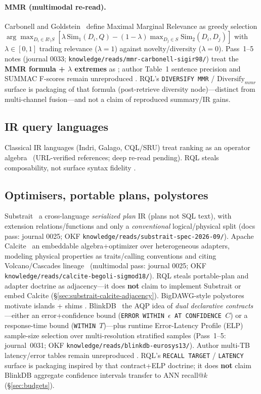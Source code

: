 \paragraph{MMR (multimodal re-read).}
Carbonell and Goldstein~\citep{carbonell1998mmr} define Maximal Marginal Relevance as greedy selection
$\arg\max_{D_i\in R\setminus S}[\lambda\,\mathrm{Sim}_1(D_i,Q)-(1-\lambda)\max_{D_j\in S}\mathrm{Sim}_2(D_i,D_j)]$
with $\lambda\in[0,1]$ trading relevance ($\lambda{=}1$) against novelty/diversity ($\lambda{=}0$).
Pass~1--5 notes (journal 0033; \texttt{knowledge/reads/mmr-carbonell-sigir98/}) treat the \textbf{MMR formula + $\lambda$ extremes} as \established{}; author Table~1 sentence precision and SUMMAC F-scores remain unreproduced \provisional{}.
RQL's \texttt{DIVERSIFY MMR} / $\mathrm{Diversify}_{mmr}$ surface is \hypothesis{} packaging of that formula (post-retrieve diversity node)---distinct from multi-channel fusion---and not a claim of reproduced summary/IR gains.

\subsection{IR query languages}
Classical IR languages (Indri, Galago, CQL/SRU) treat ranking as an operator algebra~\citep{metzler2004indri} \provisional{} (URL-verified references; deep re-read pending).
RQL steals composability, not surface syntax fidelity \hypothesis{}.

\subsection{Optimisers, portable plans, polystores}
\label{sec:rw-substrait-calcite}
Substrait~\citep{substrait} \established{} a cross-language \emph{serialized plan} IR (plans not SQL text), with extension relations/functions and only a \emph{conventional} logical/physical split (docs pass: journal 0025; OKF \texttt{knowledge/reads/substrait-spec-2026-09/}).
Apache Calcite~\citep{begoli2018calcite} \established{} an embeddable algebra+optimizer over heterogeneous adapters, modeling physical properties as traits/calling conventions and citing Volcano/Cascades lineage~\citep{graefe1995cascades} (multimodal pass: journal 0025; OKF \texttt{knowledge/reads/calcite-begoli-sigmod18/}).
RQL steals portable-plan and adapter doctrine as \hypothesis{} adjacency---it does \textbf{not} claim to implement Substrait or embed Calcite (\S\ref{sec:substrait-calcite-adjacency}).
BigDAWG-style polystores~\citep{duggan2015bigdawg} motivate islands + shims \provisional{}.
BlinkDB~\citep{agarwal2013blinkdb} \established{} the AQP idea of \emph{dual declarative contracts}---either an error+confidence bound (\texttt{ERROR WITHIN $\epsilon$ AT CONFIDENCE $C$}) or a response-time bound (\texttt{WITHIN $T$})---plus runtime Error-Latency Profile (ELP) sample-size selection over multi-resolution stratified samples (Pass~1--5: journal~0031; OKF \texttt{knowledge/reads/blinkdb-eurosys13/}).
Author multi-TB latency/error tables remain unreproduced \provisional{}.
RQL's \texttt{RECALL TARGET} / \texttt{LATENCY} surface is \hypothesis{} packaging inspired by that contract+ELP doctrine; it does \textbf{not} claim BlinkDB aggregate confidence intervals transfer to ANN recall@$k$ (\S\ref{sec:budgets}).

